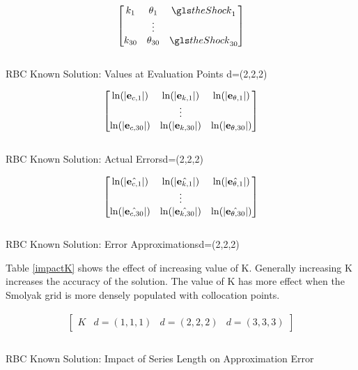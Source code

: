 \documentclass[12pt]{article}
\begin{document}
\begin{table}
  \centering
  
\begin{gather*}
  \begin{bmatrix}
    k_1&\theta_1&\theShock_1\\
&\vdots\\
    k_{30}&\theta_{30}&\theShock_{30}\\
  \end{bmatrix}\\
%  
\end{gather*}\\
  \caption{RBC Known Solution: Values at Evaluation Points \label{valatB}d=(2,2,2)}
\end{table}


 \begin{table}
    \centering
   \begin{gather*}
\forActErr\\
%  
   \end{gather*}\\
   \caption{RBC Known Solution: Actual Errors\label{acterrB}d=(2,2,2)}
 \end{table}

 \begin{table}
   \centering
  
   \begin{gather*}
\forEstErr\\
%   
   \end{gather*}\\
   \caption{RBC Known Solution: Error Approximations\label{esterrB}d=(2,2,2)}
 \end{table}


Table \ref{impactK} shows the effect of increasing value of K.  Generally
increasing K increases the accuracy of the solution.  The value of K has
more effect when the Smolyak grid is more densely populated with collocation
points.



 \begin{table}
   \centering
   \begin{gather*}
          \begin{bmatrix}
       K&d=(1,1,1)&d=(2,2,2)&d=(3,3,3)
     \end{bmatrix}\\
   \end{gather*}
   \begin{gather*}
%        
   \end{gather*}
   \caption{RBC Known Solution: Impact of Series Length on Approximation Error \label{impactK}}
 \end{table}
\end{document}
